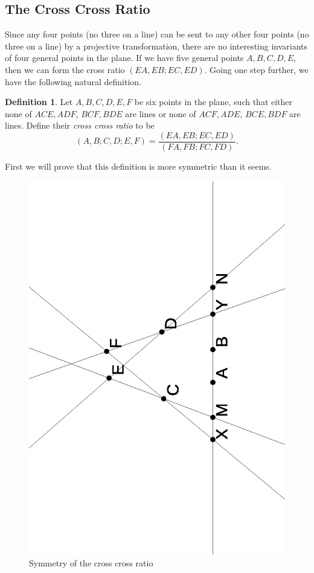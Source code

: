 \documentclass[letterpaper,11pt]{article}
\theoremstyle{definition}
\newtheorem{defn}{Definition}
\theoremstyle{remark}
\begin{document}

\subsection{The Cross Cross Ratio}

Since any four points (no three on a line) can be sent to any other four points (no three on a line) by a projective transformation, there are no interesting invariants of four general points in the plane. If we have five general points $A,B,C,D,E$, then we can form the cross ratio $(EA,EB;EC,ED)$. Going one step further, we have the following natural definition.

\begin{defn} Let $A,B,C,D,E,F$ be six points in the plane, such that either none of $ACE, ADF$, $BCF, BDE$ are lines or none of $ACF, ADE$, $BCE, BDF$ are lines. Define their \emph{cross cross ratio} to be
\[
(A,B;C,D;E,F) = \frac{(EA,EB;EC,ED)}{(FA,FB;FC,FD)}.
\]
\end{defn}

First we will prove that this definition is more symmetric than it seems.

\begin{figure}[!htb]
\centering
\includegraphics[scale=0.5,angle=270]{ccr.eps}
\caption{Symmetry of the cross cross ratio}
\end{figure}
\end{document}
